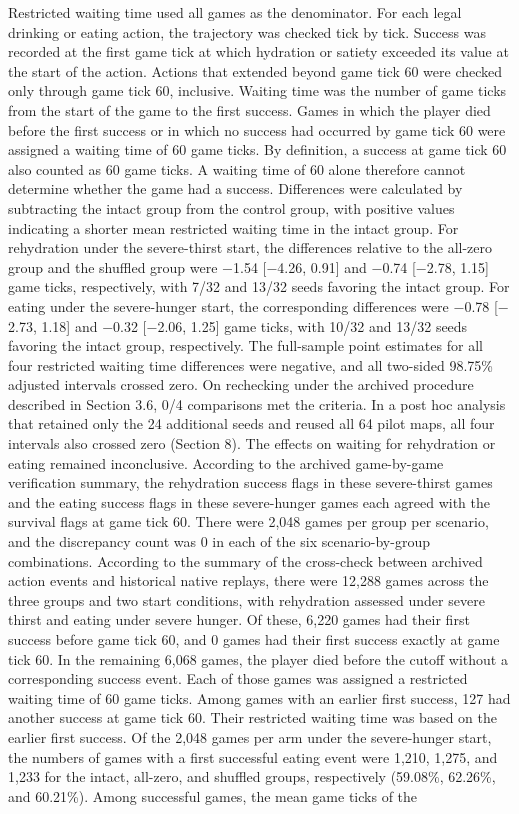 \documentclass{article}
\begin{document}
Restricted waiting time used all games as the denominator. For each legal drinking or eating action, the trajectory was checked tick by tick. Success was recorded at the first game tick at which hydration or satiety exceeded its value at the start of the action. Actions that extended beyond game tick 60 were checked only through game tick 60, inclusive. Waiting time was the number of game ticks from the start of the game to the first success. Games in which the player died before the first success or in which no success had occurred by game tick 60 were assigned a waiting time of 60 game ticks. By definition, a success at game tick 60 also counted as 60 game ticks. A waiting time of 60 alone therefore cannot determine whether the game had a success. Differences were calculated by subtracting the intact group from the control group, with positive values indicating a shorter mean restricted waiting time in the intact group. For rehydration under the severe-thirst start, the differences relative to the all-zero group and the shuffled group were \ensuremath{-}1.54 [\ensuremath{-}4.26, 0.91] and \ensuremath{-}0.74 [\ensuremath{-}2.78, 1.15] game ticks, respectively, with 7/32 and 13/32 seeds favoring the intact group. For eating under the severe-hunger start, the corresponding differences were \ensuremath{-}0.78 [\ensuremath{-}2.73, 1.18] and \ensuremath{-}0.32 [\ensuremath{-}2.06, 1.25] game ticks, with 10/32 and 13/32 seeds favoring the intact group, respectively. The full-sample point estimates for all four restricted waiting time differences were negative, and all two-sided 98.75\% adjusted intervals crossed zero. On rechecking under the archived procedure described in Section 3.6, 0/4 comparisons met the criteria. In a post hoc analysis that retained only the 24 additional seeds and reused all 64 pilot maps, all four intervals also crossed zero (Section 8). The effects on waiting for rehydration or eating remained inconclusive. According to the archived game-by-game verification summary, the rehydration success flags in these severe-thirst games and the eating success flags in these severe-hunger games each agreed with the survival flags at game tick 60. There were 2,048 games per group per scenario, and the discrepancy count was 0 in each of the six scenario-by-group combinations. According to the summary of the cross-check between archived action events and historical native replays, there were 12,288 games across the three groups and two start conditions, with rehydration assessed under severe thirst and eating under severe hunger. Of these, 6,220 games had their first success before game tick 60, and 0 games had their first success exactly at game tick 60. In the remaining 6,068 games, the player died before the cutoff without a corresponding success event. Each of those games was assigned a restricted waiting time of 60 game ticks. Among games with an earlier first success, 127 had another success at game tick 60. Their restricted waiting time was based on the earlier first success. Of the 2,048 games per arm under the severe-hunger start, the numbers of games with a first successful eating event were 1,210, 1,275, and 1,233 for the intact, all-zero, and shuffled groups, respectively (59.08\%, 62.26\%, and 60.21\%). Among successful games, the mean game ticks of the 
\end{document}

